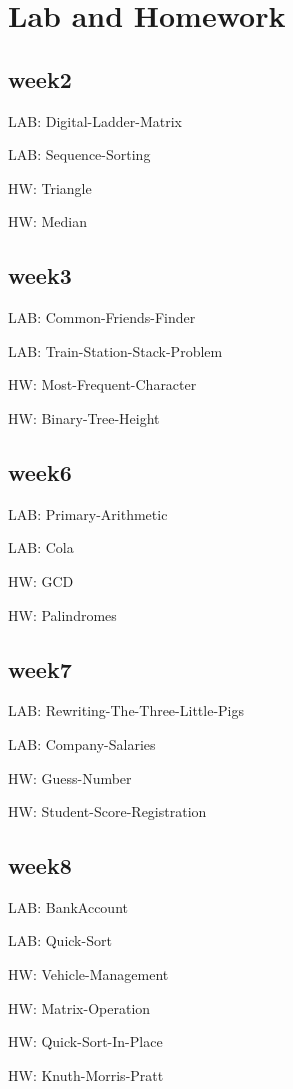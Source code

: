 \documentclass[a4paper,10pt,twocolumn,oneside]{article}
\begin{document}
\iffalse
\section{Lab and Homework}
\subsection{week2}
LAB: Digital-Ladder-Matrix

LAB: Sequence-Sorting

HW: Triangle

HW: Median


\subsection{week3}
LAB: Common-Friends-Finder

LAB: Train-Station-Stack-Problem

HW: Most-Frequent-Character

HW: Binary-Tree-Height


\subsection{week6}
LAB: Primary-Arithmetic

LAB: Cola

HW: GCD

HW: Palindromes


\subsection{week7}
LAB: Rewriting-The-Three-Little-Pigs

LAB: Company-Salaries

HW: Guess-Number

HW: Student-Score-Registration


\subsection{week8}
LAB: BankAccount

LAB: Quick-Sort

HW: Vehicle-Management

HW: Matrix-Operation

HW: Quick-Sort-In-Place

HW: Knuth-Morris-Pratt

\end{document}
